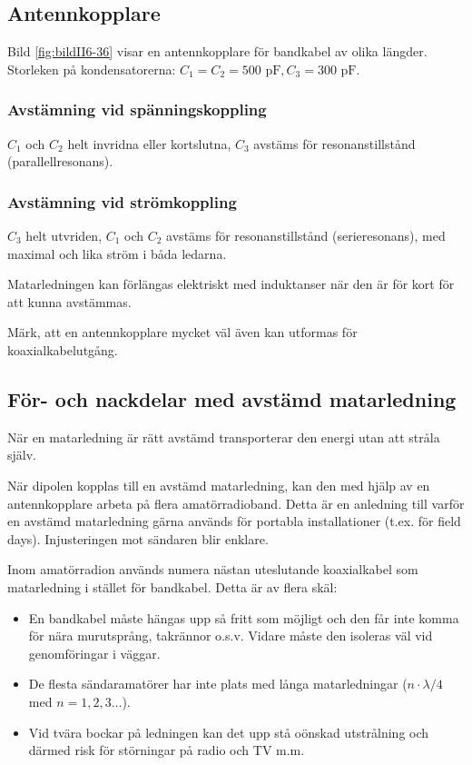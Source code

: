 \subsection{Antennkopplare}
%
Bild \ref{fig:bildII6-36} visar en antennkopplare för bandkabel av olika
längder. Storleken på kondensatorerna: \(C_1 = C_2 = 500\text{ pF},
C_3 = 300\text{ pF}\).

\subsubsection{Avstämning vid spänningskoppling}

\(C_1\) och \(C_2\) helt invridna eller kortslutna, \(C_3\) avstäms
för resonanstillstånd (parallellresonans).

\subsubsection{Avstämning vid strömkoppling}

\(C_3\) helt utvriden, \(C_1\) och \(C_2\) avstäms för
resonanstillstånd (serieresonans), med maximal och lika ström i båda
ledarna.

Matarledningen kan förlängas elektriskt med induktanser när den är för
kort för att kunna avstämmas.

Märk, att en antennkopplare mycket väl även kan utformas för
koaxialkabelutgång.

\subsection{För- och nackdelar med avstämd matarledning}

När en matarledning är rätt avstämd transporterar den energi utan att
stråla själv.

När dipolen kopplas till en avstämd matarledning, kan den med hjälp av
en antennkopplare arbeta på flera amatörradioband. Detta är en
anledning till varför en avstämd matarledning gärna används för
portabla installationer (t.ex. för field days). Injusteringen mot
sändaren blir enklare.

Inom amatörradion används numera nästan uteslutande koaxialkabel som
matarledning i stället för bandkabel. Detta är av flera skäl:
\begin{itemize}
\item En bandkabel måste hängas upp så fritt som möjligt och den får
  inte komma för nära murutsprång, takrännor o.s.v. Vidare måste den
  isoleras väl vid genomföringar i väggar.
\item De flesta sändaramatörer har inte plats med långa matarledningar
  (\(n\cdot\lambda/4\) med \(n = 1, 2, 3 \dots\)).
\item Vid tvära bockar på ledningen kan det upp stå oönskad
  utstrålning och därmed risk för störningar på radio och TV m.m.
\end{itemize}

